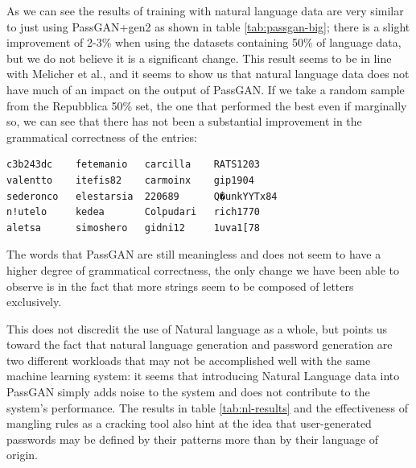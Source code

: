 As we can see the results of training with natural language data are very similar to just using PassGAN+gen2 as shown in table \ref{tab:passgan-big}; there is a slight improvement of 2-3\% when using the datasets containing 50\% of language data, but we do not believe it is a significant change. This result seems to be in line with Melicher et al.\cite{Melicher2016}, and it seems to show us that natural language data does not have much of an impact on the output of PassGAN. 
\newpage
If we take a random sample from the Repubblica 50\% set, the one that performed the best even if marginally so, we can see that there has not been a substantial improvement in the grammatical correctness of the entries:
\begin{verbatim}
c3b243dc    fetemanio   carcilla    RATS1203
valentto    itefis82    carmoinx    gip1904
sederonco   elestarsia  220689      Q�unkYYTx84
n!utelo     kedea       Colpudari   rich1770
aletsa      simoshero   gidni12     1uva1[78
\end{verbatim}    

The words that PassGAN are still meaningless and does not seem to have a higher degree of grammatical correctness, the only change we have been able to observe is in the fact that more strings seem to be composed of letters exclusively.

This does not discredit the use of Natural language as a whole, but points us toward the fact that natural language generation and password generation are two different workloads that may not be accomplished well with the same machine learning system: it seems that introducing Natural Language data into PassGAN simply adds noise to the system and does not contribute to the system's performance.
The results in table \ref{tab:nl-results} and the effectiveness of mangling rules as a cracking tool also hint at the idea that user-generated passwords may be defined by their patterns more than by their language of origin. 
